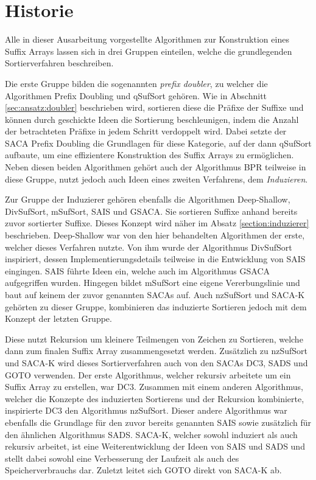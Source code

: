 \section{Historie}
Alle  in dieser Ausarbeitung vorgestellte Algorithmen zur Konstruktion eines Suffix Arrays lassen sich in drei Gruppen einteilen, welche die grundlegenden Sortierverfahren beschreiben. \par
Die erste Gruppe bilden die sogenannten \textit{prefix doubler}, zu welcher die Algorithmen Prefix Doubling und qSufSort gehören.
Wie in Abschnitt \ref{sec:ansatz:doubler} beschrieben wird, sortieren diese die Präfixe der Suffixe und können durch geschickte Ideen die Sortierung beschleunigen, indem die Anzahl der betrachteten Präfixe in jedem Schritt verdoppelt wird. 
Dabei setzte der SACA Prefix Doubling die Grundlagen für diese Kategorie, auf der dann qSufSort aufbaute, um eine effizientere Konstruktion des Suffix Arrays zu ermöglichen. 
Neben diesen beiden Algorithmen gehört auch der Algorithmus BPR teilweise in diese Gruppe, nutzt jedoch auch Ideen eines zweiten Verfahrens, dem \textit{Induzieren}. \par

Zur Gruppe der Induzierer gehören ebenfalls die Algorithmen Deep-Shallow, DivSufSort, mSufSort, SAIS und GSACA.
Sie sortieren Suffixe anhand bereits zuvor sortierter Suffixe.
Dieses Konzept wird näher im Absatz \ref{section:induzierer} beschrieben.
Deep-Shallow war von den hier behandelten Algorithmen der erste, welcher dieses Verfahren nutzte.
Von ihm wurde der Algorithmus DivSufSort inspiriert, dessen Implementierungsdetails teilweise in die Entwicklung von SAIS eingingen.
SAIS führte Ideen ein, welche auch im Algorithmus GSACA aufgegriffen wurden.
Hingegen bildet mSufSort eine eigene Vererbungslinie und baut auf keinem der zuvor genannten SACAs auf.
Auch nzSufSort und SACA-K gehörten zu dieser Gruppe, kombinieren das induzierte Sortieren jedoch mit dem Konzept der letzten Gruppe. \par

Diese nutzt Rekursion um kleinere Teilmengen von Zeichen zu Sortieren, welche dann zum finalen Suffix Array zusammengesetzt werden.
Zusätzlich zu nzSufSort und SACA-K wird dieses Sortierverfahren auch von den SACAs DC3, SADS und GOTO verwenden. 
Der erste Algorithmus, welcher rekursiv arbeitete um ein Suffix Array zu erstellen, war DC3. 
Zusammen mit einem anderen Algorithmus, welcher die Konzepte des induzierten Sortierens und der Rekursion kombinierte, inspirierte DC3 den Algorithmus nzSufSort. 
Dieser andere Algorithmus war ebenfalls die Grundlage für den zuvor bereits genannten SAIS sowie zusätzlich für den ähnlichen Algorithmus SADS.
SACA-K, welcher sowohl induziert als auch rekursiv arbeitet, ist eine Weiterentwicklung der Ideen von SAIS und SADS und stellt dabei sowohl eine Verbesserung der Laufzeit als auch des Speicherverbrauchs dar.
Zuletzt leitet sich GOTO direkt von SACA-K ab. \par


